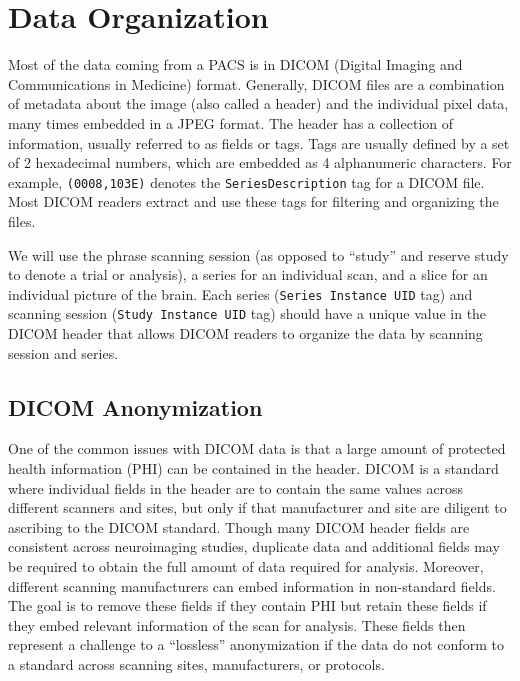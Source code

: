\documentclass[]{elsarticle} %
\begin{document}
\hypertarget{data-organization}{%
\section{Data Organization}\label{data-organization}}

Most of the data coming from a PACS is in DICOM (Digital Imaging and
Communications in Medicine) format. Generally, DICOM files are a
combination of metadata about the image (also called a header) and the
individual pixel data, many times embedded in a JPEG format. The header
has a collection of information, usually referred to as fields or tags.
Tags are usually defined by a set of 2 hexadecimal numbers, which are
embedded as 4 alphanumeric characters. For example, \texttt{(0008,103E)}
denotes the \texttt{SeriesDescription} tag for a DICOM file. Most DICOM
readers extract and use these tags for filtering and organizing the
files.

We will use the phrase scanning session (as opposed to ``study'' and
reserve study to denote a trial or analysis), a series for an individual
scan, and a slice for an individual picture of the brain. Each series
(\texttt{Series\ Instance\ UID} tag) and scanning session
(\texttt{Study\ Instance\ UID} tag) should have a unique value in the
DICOM header that allows DICOM readers to organize the data by scanning
session and series.

\hypertarget{dicom-anonymization}{%
\subsection{DICOM Anonymization}\label{dicom-anonymization}}

One of the common issues with DICOM data is that a large amount of
protected health information (PHI) can be contained in the header. DICOM
is a standard where individual fields in the header are to contain the
same values across different scanners and sites, but only if that
manufacturer and site are diligent to ascribing to the DICOM standard.
Though many DICOM header fields are consistent across neuroimaging
studies, duplicate data and additional fields may be required to obtain
the full amount of data required for analysis. Moreover, different
scanning manufacturers can embed information in non-standard fields. The
goal is to remove these fields if they contain PHI but retain these
fields if they embed relevant information of the scan for analysis.
These fields then represent a challenge to a ``lossless'' anonymization
if the data do not conform to a standard across scanning sites,
manufacturers, or protocols.
\end{document}
